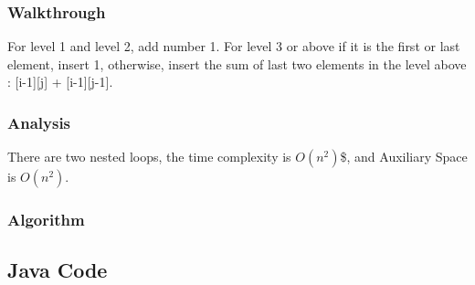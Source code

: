 \documentclass[]{book}
\begin{document}
\hypertarget{walkthrough-9}{%
\subsubsection{Walkthrough}\label{walkthrough-9}}

For level 1 and level 2, add number 1. For level 3 or above if it is the first or last element, insert 1, otherwise,
insert the sum of last two elements in the level above : {[}i-1{]}{[}j{]} + {[}i-1{]}{[}j-1{]}.

\hypertarget{analysis-10}{%
\subsubsection{Analysis}\label{analysis-10}}

There are two nested loops, the time complexity is \(O(n^2)\)\$, and Auxiliary Space is \(O(n^2)\).

\hypertarget{algorithm-10}{%
\subsubsection{Algorithm}\label{algorithm-10}}

\hypertarget{java-code-8}{%
\subsection{Java Code}\label{java-code-8}}
\end{document}
